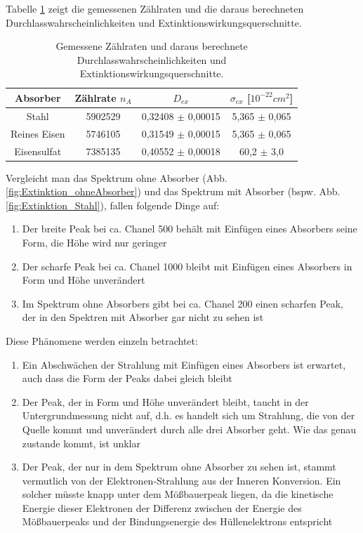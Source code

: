 \documentclass[12pt,a4paper]{article}
\begin{document}
Tabelle \ref{tab:Extinktion_Ergebnisse} zeigt die gemessenen Zählraten und die daraus berechneten Durchlasswahrscheinlichkeiten und Extinktionswirkungsquerschnitte.\\


\begin{table}
\centering
\begin{tabular}{|c|c|c|c|}
\hline 
Absorber & Zählrate $n_A$ & $D_{ex}$ & $\sigma _{ex}$ [$10^{-22} \si{cm^2}$] \\ 
\hline 
Stahl & 5902529 & 0,32408 $\pm$ 0,00015 & 5,365 $\pm$ 0,065 \\
\hline 
Reines Eisen & 5746105 & 0,31549 $\pm$ 0,00015 & 5,365 $\pm$ 0,065 \\
\hline
Eisensulfat & 7385135 & 0,40552 $\pm$ 0,00018 & 60,2 $\pm$ 3,0 \\
\hline
\end{tabular} 
\caption{Gemessene Zählraten und daraus berechnete Durchlasswahrscheinlichkeiten und Extinktionswirkungsquerschnitte.}
\label{tab:Extinktion_Ergebnisse}
\end{table}

Vergleicht man das Spektrum ohne Absorber (Abb. \ref{fig:Extinktion_ohneAbsorber}) und das Spektrum mit Absorber (bspw. Abb. \ref{fig:Extinktion_Stahl}), fallen folgende Dinge auf:
\begin{enumerate}
\item Der breite Peak bei ca. Chanel 500 behält mit Einfügen eines Absorbers seine Form, die Höhe wird nur geringer
\item Der scharfe Peak bei ca. Chanel 1000 bleibt mit Einfügen eines Absorbers in Form und Höhe unverändert
\item Im Spektrum ohne Absorbers gibt bei ca. Chanel 200 einen scharfen Peak, der in den Spektren mit Absorber gar nicht zu sehen ist
\end{enumerate}
Diese Phänomene werden einzeln betrachtet:
\begin{enumerate}
\item Ein Abschwächen der Strahlung mit Einfügen eines Absorbers ist erwartet, auch dass die Form der Peaks dabei gleich bleibt
\item Der Peak, der in Form und Höhe unverändert bleibt, taucht in der Untergrundmessung nicht auf, d.h. es handelt sich um Strahlung, die von der Quelle kommt und unverändert durch alle drei Absorber geht. Wie das genau zustande kommt, ist unklar
\item Der Peak, der nur in dem Spektrum ohne Absorber zu sehen ist, stammt vermutlich von der Elektronen-Strahlung aus der Inneren Konversion. Ein solcher müsste knapp unter dem Mößbauerpeak liegen, da die kinetische Energie dieser Elektronen der Differenz zwischen der Energie des Mößbauerpeaks und der Bindungsenergie des Hüllenelektrons entspricht
\end{enumerate}
\end{document}
